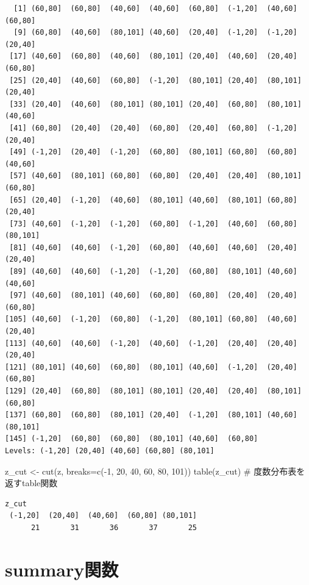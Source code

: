 \documentclass[
  letterpaper,
  DIV=11,
  numbers=noendperiod]{scrreprt}
\newenvironment{Shaded}{\begin{snugshade}}{\end{snugshade}}
\newcommand{\AttributeTok}[1]{\textcolor[rgb]{0.40,0.45,0.13}{#1}}
\newcommand{\CommentTok}[1]{\textcolor[rgb]{0.37,0.37,0.37}{#1}}
\newcommand{\DecValTok}[1]{\textcolor[rgb]{0.68,0.00,0.00}{#1}}
\newcommand{\FunctionTok}[1]{\textcolor[rgb]{0.28,0.35,0.67}{#1}}
\newcommand{\NormalTok}[1]{\textcolor[rgb]{0.00,0.23,0.31}{#1}}
\newcommand{\OtherTok}[1]{\textcolor[rgb]{0.00,0.23,0.31}{#1}}
\newcommand{\SpecialCharTok}[1]{\textcolor[rgb]{0.37,0.37,0.37}{#1}}
\begin{document}
\begin{verbatim}
  [1] (60,80]  (60,80]  (40,60]  (40,60]  (60,80]  (-1,20]  (40,60]  (60,80] 
  [9] (60,80]  (40,60]  (80,101] (40,60]  (20,40]  (-1,20]  (-1,20]  (20,40] 
 [17] (40,60]  (60,80]  (40,60]  (80,101] (20,40]  (40,60]  (20,40]  (60,80] 
 [25] (20,40]  (40,60]  (60,80]  (-1,20]  (80,101] (20,40]  (80,101] (20,40] 
 [33] (20,40]  (40,60]  (80,101] (80,101] (20,40]  (60,80]  (80,101] (40,60] 
 [41] (60,80]  (20,40]  (20,40]  (60,80]  (20,40]  (60,80]  (-1,20]  (20,40] 
 [49] (-1,20]  (20,40]  (-1,20]  (60,80]  (80,101] (60,80]  (60,80]  (40,60] 
 [57] (40,60]  (80,101] (60,80]  (60,80]  (20,40]  (20,40]  (80,101] (60,80] 
 [65] (20,40]  (-1,20]  (40,60]  (80,101] (40,60]  (80,101] (60,80]  (20,40] 
 [73] (40,60]  (-1,20]  (-1,20]  (60,80]  (-1,20]  (40,60]  (60,80]  (80,101]
 [81] (40,60]  (40,60]  (-1,20]  (60,80]  (40,60]  (40,60]  (20,40]  (20,40] 
 [89] (40,60]  (40,60]  (-1,20]  (-1,20]  (60,80]  (80,101] (40,60]  (40,60] 
 [97] (40,60]  (80,101] (40,60]  (60,80]  (60,80]  (20,40]  (20,40]  (60,80] 
[105] (40,60]  (-1,20]  (60,80]  (-1,20]  (80,101] (60,80]  (40,60]  (20,40] 
[113] (40,60]  (40,60]  (-1,20]  (40,60]  (-1,20]  (20,40]  (20,40]  (20,40] 
[121] (80,101] (40,60]  (60,80]  (80,101] (40,60]  (-1,20]  (20,40]  (60,80] 
[129] (20,40]  (60,80]  (80,101] (80,101] (20,40]  (20,40]  (80,101] (60,80] 
[137] (60,80]  (60,80]  (80,101] (20,40]  (-1,20]  (80,101] (40,60]  (80,101]
[145] (-1,20]  (60,80]  (60,80]  (80,101] (40,60]  (60,80] 
Levels: (-1,20] (20,40] (40,60] (60,80] (80,101]
\end{verbatim}

\begin{Shaded}
\begin{Highlighting}[]
\NormalTok{z\_cut }\OtherTok{\textless{}{-}} \FunctionTok{cut}\NormalTok{(z, }\AttributeTok{breaks=}\FunctionTok{c}\NormalTok{(}\SpecialCharTok{{-}}\DecValTok{1}\NormalTok{, }\DecValTok{20}\NormalTok{, }\DecValTok{40}\NormalTok{, }\DecValTok{60}\NormalTok{, }\DecValTok{80}\NormalTok{, }\DecValTok{101}\NormalTok{)) }
\FunctionTok{table}\NormalTok{(z\_cut) }\CommentTok{\# 度数分布表を返すtable関数}
\end{Highlighting}
\end{Shaded}

\begin{verbatim}
z_cut
 (-1,20]  (20,40]  (40,60]  (60,80] (80,101] 
      21       31       36       37       25 
\end{verbatim}

\hypertarget{summaryux95a2ux6570}{%
\section{summary関数}\label{summaryux95a2ux6570}}
\end{document}
